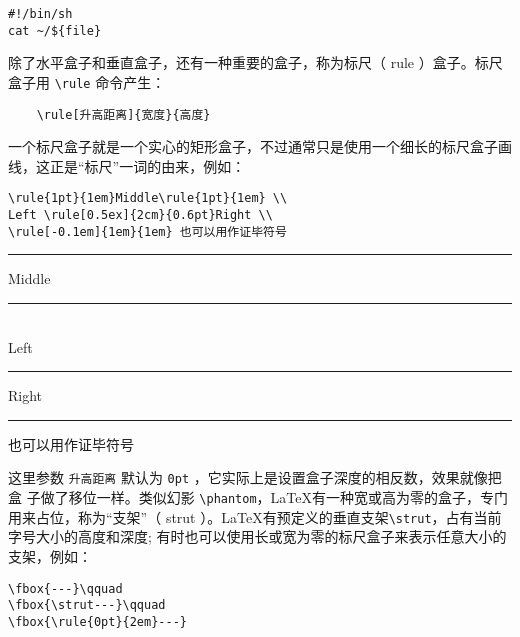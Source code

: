 \newsavebox{\verbatimbox} % 通常在导言区定义
\begin{lrbox}{\verbatimbox}
    \begin{minipage}{10em}
        \begin{verbatim}
#!/bin/sh
cat ~/${file}
        \end{verbatim}
    \end{minipage}
\end{lrbox}
\fbox{\usebox{\verbatimbox}} \quad
\fbox{\usebox{\verbatimbox}}

\vspace{0.1cm}
除了水平盒子和垂直盒子，还有一种重要的盒子，称为标尺（ rule ）盒子。标尺盒子用 \verb|\rule| 命令产生：
\begin{lstlisting}
    \rule[升高距离]{宽度}{高度}
\end{lstlisting}

一个标尺盒子就是一个实心的矩形盒子，不过通常只是使用一个细长的标尺盒子画线，这正是“标尺”一词的由来，例如：

\begin{minipage}[t]{0.45\textwidth}
\begin{lstlisting}
\rule{1pt}{1em}Middle\rule{1pt}{1em} \\
Left \rule[0.5ex]{2cm}{0.6pt}Right \\
\rule[-0.1em]{1em}{1em} 也可以用作证毕符号
\end{lstlisting}
\end{minipage}
\hfill
\begin{minipage}[t]{0.45\textwidth}
    \rule{1pt}{1em}Middle\rule{1pt}{1em} \\
    Left \rule[0.5ex]{2cm}{0.6pt}Right \\
    \rule[-0.1em]{1em}{1em} 也可以用作证毕符号
\end{minipage}

这里参数 \verb|升高距离| 默认为 \verb|0pt| ，它实际上是设置盒子深度的相反数，效果就像把盒
子做了移位一样。类似幻影 \verb|\phantom|，\LaTeX 有一种宽或高为零的盒子，专门用来占位，称为“支架”（ strut ）。\LaTeX 有预定义的垂直支架\verb|\strut|，占有当前字号大小的高度和深度;
有时也可以使用长或宽为零的标尺盒子来表示任意大小的支架，例如：

\begin{minipage}[t]{0.45\textwidth}
\begin{lstlisting}
\fbox{---}\qquad
\fbox{\strut---}\qquad
\fbox{\rule{0pt}{2em}---}
\end{lstlisting}
\end{minipage}
\hfill
\begin{minipage}[t]{0.45\textwidth}
\fbox{---}\qquad
\fbox{\strut---}\qquad
\fbox{\rule{0pt}{2em}---}
\end{minipage}

